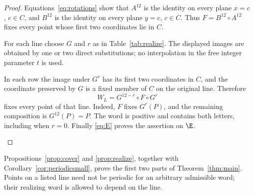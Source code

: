 \begin{proof}
Equations~\eqref{eq:rotations} show that $A^{12}$ is the
identity on every plane $x=c$, $c\in C$, and $B^{12}$
is the identity on every plane $y=c$, $c\in C$.
Thus $F=B^{12}\circ A^{12}$ fixes every point whose first
two coordinates lie in $C$.

For each line choose $G$ and $r$ as in
Table~\ref{tab:realize}. The displayed images are obtained
by one or two direct substitutions; no interpolation in
the free integer parameter $t$ is used.



\begin{samepage}
In each row the image under $G^r$ has its first two
coordinates in $C$, and the coordinate preserved by $G$
is a fixed member of $C$ on the original line. Therefore
\begin{equation}\label{eq:lineword}
 W_L=G^{12-r}\circ F\circ G^r
\end{equation}
fixes every point of that line. Indeed, $F$ fixes $G^r(P)$,
and the remaining composition is $G^{12}(P)=P$.
The word is positive and contains both letters, including
when $r=0$. Finally \eqref{eq:E} proves the assertion
on $\E$.
\end{samepage}
\end{proof}

Propositions~\ref{prop:cover} and \ref{prop:realize}, together
with Corollary~\ref{cor:periodicsmall}, prove the first two
parts of Theorem~\ref{thm:main}. Points on a listed line need
not be periodic for an arbitrary admissible word; their
realizing word is allowed to depend on the line.
